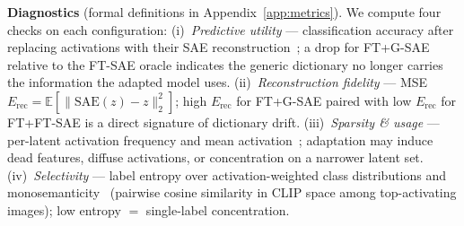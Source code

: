 \noindent\textbf{Diagnostics} (formal definitions in Appendix~\ref{app:metrics}).
We compute four checks on each configuration:
(i)~\emph{Predictive utility} — classification accuracy after replacing activations with their SAE reconstruction~\citep{lim2024patchsae}; a drop for FT+G-SAE relative to the FT-SAE oracle indicates the generic dictionary no longer carries the information the adapted model uses.
(ii)~\emph{Reconstruction fidelity} — MSE $E_{\mathrm{rec}}=\mathbb{E}[\|\mathrm{SAE}(z)-z\|_2^2]$; high $E_{\mathrm{rec}}$ for FT+G-SAE paired with low $E_{\mathrm{rec}}$ for FT+FT-SAE is a direct signature of dictionary drift.
(iii)~\emph{Sparsity \& usage} — per-latent activation frequency and mean activation~\citep{cunningham2024sparse,gao2025scaling}; adaptation may induce dead features, diffuse activations, or concentration on a narrower latent set.
(iv)~\emph{Selectivity} — label entropy over activation-weighted class distributions and monosemanticity~\citep{cunningham2024sparse} (pairwise cosine similarity in CLIP space among top-activating images); low entropy $=$ single-label concentration.